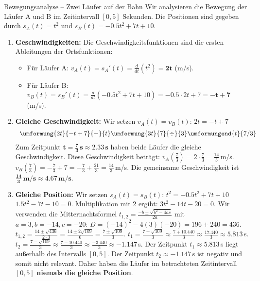 \begin{loesungsumgebung}{Bewegungsanalyse – Zwei Läufer auf der Bahn}
Wir analysieren die Bewegung der Läufer A und B im Zeitintervall $[0, 5]$ Sekunden.
Die Positionen sind gegeben durch $s_A(t) = t^2$ und $s_B(t) = -0.5t^2 + 7t + 10$.

\begin{enumerate}[label=(\alph*)]
    \item \textbf{Geschwindigkeiten:}
    Die Geschwindigkeitsfunktionen sind die ersten Ableitungen der Ortsfunktionen:
    \begin{itemize}
        \item Für Läufer A: $v_A(t) = s_A'(t) = \frac{d}{dt}(t^2) = \mathbf{2t}$ (m/s).
        \item Für Läufer B: $v_B(t) = s_B'(t) = \frac{d}{dt}(-0.5t^2 + 7t + 10) = -0.5 \cdot 2t + 7 = \mathbf{-t + 7}$ (m/s).
    \end{itemize}

    \item \textbf{Gleiche Geschwindigkeit:}
    Wir setzen $v_A(t) = v_B(t)$:
    $2t = -t + 7$
    $$
    \begin{array}{r c l c l}
    \umformung{2t}{-t+7}{+}{t}
    \umformung{3t}{7}{\div}{3}
    \umformungend{t}{7/3}
    \end{array}
    $$
    Zum Zeitpunkt $\mathbf{t = \frac{7}{3}\,s \approx 2.33\,s}$ haben beide Läufer die gleiche Geschwindigkeit.
    Diese Geschwindigkeit beträgt:
    $v_A(\frac{7}{3}) = 2 \cdot \frac{7}{3} = \frac{14}{3}\,$m/s.
    $v_B(\frac{7}{3}) = -\frac{7}{3} + 7 = -\frac{7}{3} + \frac{21}{3} = \frac{14}{3}\,$m/s.
    Die gemeinsame Geschwindigkeit ist $\mathbf{\frac{14}{3}\,m/s \approx 4.67\,m/s}$.

    \item \textbf{Gleiche Position:}
    Wir setzen $s_A(t) = s_B(t)$:
    $t^2 = -0.5t^2 + 7t + 10$
    $1.5t^2 - 7t - 10 = 0$.
    Multiplikation mit 2 ergibt: $3t^2 - 14t - 20 = 0$.
    Wir verwenden die Mitternachtsformel $t_{1,2} = \frac{-b \pm \sqrt{b^2-4ac}}{2a}$ mit $a=3, b=-14, c=-20$:
    $D = (-14)^2 - 4(3)(-20) = 196 + 240 = 436$.
    $t_{1,2} = \frac{14 \pm \sqrt{436}}{2 \cdot 3} = \frac{14 \pm 2\sqrt{109}}{6} = \frac{7 \pm \sqrt{109}}{3}$.
    $t_1 = \frac{7 + \sqrt{109}}{3} \approx \frac{7 + 10.440}{3} \approx \frac{17.440}{3} \approx 5.813\,$s.
    $t_2 = \frac{7 - \sqrt{109}}{3} \approx \frac{7 - 10.440}{3} \approx \frac{-3.440}{3} \approx -1.147\,$s.
    Der Zeitpunkt $t_1 \approx 5.813\,$s liegt außerhalb des Intervalls $[0,5]$. Der Zeitpunkt $t_2 \approx -1.147\,$s ist negativ und somit nicht relevant.
    Daher haben die Läufer im betrachteten Zeitintervall $[0,5]$ \textbf{niemals die gleiche Position}.


\end{enumerate}
\end{loesungsumgebung}
